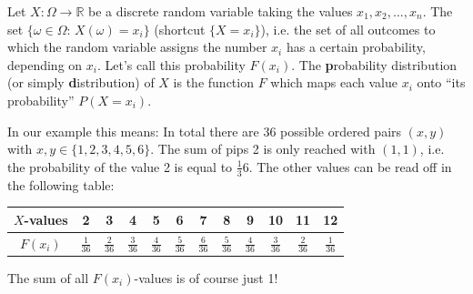 \documentclass[twoside,11pt,a4paper]{article}
\newif\ifEN \ENtrue	                %
\def\tr|#1|#2|{\ifEN #2\else #1\fi}     %
\newenvironment{ttile}[1]{\begin{tcolorbox}[colback=tile,sharp corners,title=#1]}{\end{tcolorbox}}
\def\vsp{\vspace{5mm}}
\theoremstyle{definition}
\begin{document}
\begin{ttile}{\tr|Wahrscheinlickeitsverteilung|Probability distribution|}
  \tr|Sei $X: \Omega\to\mathbb{R}$ eine diskrete Zufallsvariable, die die Werte $x_1, x_2, \ldots, x_n$ annimmt.
  Die Menge $\{\omega\in\Omega:\, X(\omega)=x_i\}$ (Abkürzung $\{X=x_i\}$), d.h. die Menge aller Ergebnisse, welcher die Zufallsvariable die Zahl $x_i$ zuordnet,
  hat eine gewisse Wahrscheinlichkeit, die von $x_i$ abhängt. 
  Nennen wir diese Wahrscheinlichkeit $F(x_i)$,
  die \textbf{Wahrscheinlichkeitsverteilung} (oder kurz \textbf{Verteilung})  von $X$.
  |Let $X: \Omega\to \mathbb{R}$ be a discrete random variable taking the values $x_1, x_2, \ldots, x_n$.
  The set $\{\omega\in\Omega:\, X(\omega)=x_i\}$ (shortcut $\{X=x_i\}$), i.e. the set of all outcomes to which the
  random variable assigns the number $x_i$ has a certain probability, depending on $x_i$.
  Let's call this probability $F(x_i)$. 
  The \textbf{probability distribution}   (or simply \textbf{distribution})  of $X$
  is the function 
  $F$ which  maps each value $x_i$ onto ``its probability'' $P(X=x_i)$.|
\end{ttile}
\vsp

\tr|In unserem Beispiel bedeutet dies: Insgesamt gibt es 36 Paare $(x,y)$ mit 
    $$x, y \in \{1,2,3,4,5,6\}$$. 
    Die Ausgensumme 2 kann nur mit dem Paar $(1,1)$ erreicht werden, d.h. die Wahrscheinlichkeit für den Wert 2 ist $\frac1{36}$. 
    Die restlichen Werte können in der folgenden Tabelle abgelesen werden:
   |In our example this means: In total there are 36 possible ordered pairs $(x,y)$ with $x, y \in \{1,2,3,4,5,6\}$. 
    The sum of pips 2 is only reached with $(1,1)$, i.e. the probability of the value 2 is equal to $\frac{1}{36}$. 
    The other values can be read off in the following table:|
\begin{center}
\begin{tabular}{c|c|c|c|c|c|c|c|c|c|c|c}
\tr|$X$-Werte|$X$-values| & 2 & 3 & 4 & 5 & 6 & 7 & 8 & 9 & 10 & 11 & 12 \\
\hline
$F(x_i)$ & $\frac{1}{36}$ & $\frac{2}{36}$ &$\frac{3}{36}$ &$\frac{4}{36}$ &$\frac{5}{36}$ &$\frac{6}{36}$ &$\frac{5}{36}$ &$\frac{4}{36}$ &$\frac{3}{36}$ &$\frac{2}{36}$ & $\frac{1}{36}$ 
\end{tabular}
\end{center}
\vsp

\begin{remark}
\tr|Die Summe aller $F(x_i)$-Werte ist natürlich genau 1. |The sum of all $F(x_i)$-values is of course just 1!|
\end{remark}
\end{document}
